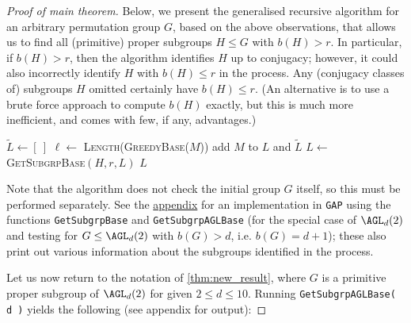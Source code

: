 \begin{proof}[Proof of main theorem]
    Below, we present the generalised recursive algorithm for an arbitrary permutation group $G$, based on the above observations, that allows us to find all (primitive) proper subgroups $H \leq G$ with $b(H) > r$. In particular, if $b(H) > r$, then the algorithm identifies $H$ up to conjugacy; however, it could also incorrectly identify $H$ with $b(H) \leq r$ in the process. Any (conjugacy classes of) subgroups $H$ omitted certainly have $b(H) \leq r$. (An alternative is to use a brute force approach to compute $b(H)$ exactly, but this is much more inefficient, and comes with few, if any, advantages.)

    \begin{algorithmic}[1]
        \State $\tilde L \gets [\ ]$
         $\ell \gets$ \textsc{Length}(\textsc{GreedyBase}($M$))
         add $M$ to $L$ and $\tilde L$
        \EndIf
        \EndIf
        \EndFor
        \State $L \gets$ \textsc{GetSubgrpBase}$(H,r,L)$
        \EndFor
        \State \Return $L$
        \EndProcedure
    \end{algorithmic}

    Note that the algorithm does not check the initial group $G$ itself, so this must be performed separately. See the \hyperref[app:subgrps_base_len]{appendix} for an implementation in \texttt{GAP} using the functions \texttt{GetSubgrpBase} and \texttt{GetSubgrpAGLBase} (for the special case of $\AGL_d(2)$ and testing for $G \leq \AGL_d(2)$ with $b(G) > d$, i.e. $b(G) = d + 1$); these also print out various information about the subgroups identified in the process.

    Let us now return to the notation of \autoref{thm:new_result}, where $G$ is a primitive proper subgroup of $\AGL_d(2)$ for given $2 \leq d \leq 10$. Running \texttt{GetSubgrpAGLBase( d )} yields the following (see appendix for output):


\end{proof}
